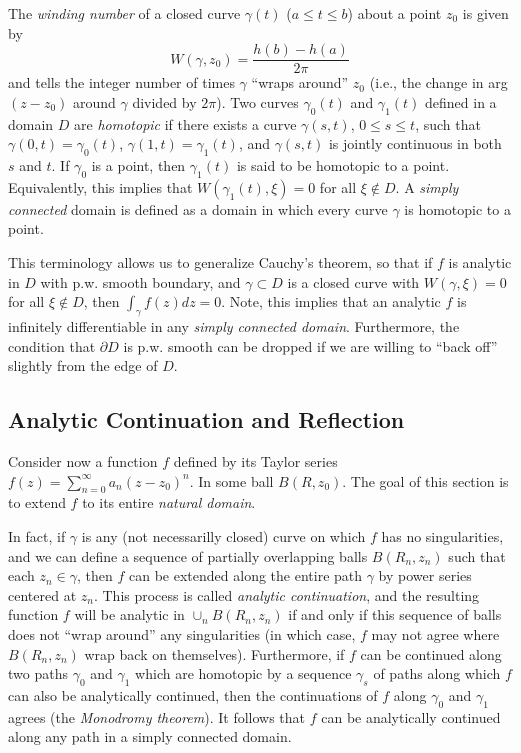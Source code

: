 \documentclass[12pt]{article}
\begin{document}
The {\it winding number} of a closed curve $\gamma(t)$ ($a \leq t \leq b$)
about a point $z_0$ is given by
$$
W(\gamma, z_0) = \frac{h(b) - h(a)}{2\pi}
$$
and tells the integer number of times $\gamma$ ``wraps around'' $z_0$
(i.e., the change in arg$(z-z_0)$ around $\gamma$ divided by $2\pi$).
Two curves $\gamma_0(t)$ and $\gamma_1(t)$ defined in a domain $D$
are {\it homotopic} if there exists a curve $\gamma(s,t)$, $0\leq s\leq t$,
such that $\gamma(0,t)=\gamma_0(t)$, $\gamma(1,t)=\gamma_1(t)$, and
$\gamma(s,t)$ is jointly continuous in both $s$ and $t$. If $\gamma_0$
is a point, then $\gamma_1(t)$ is said to be homotopic to a point.
Equivalently, this implies that $W(\gamma_1(t),\xi)=0$ for all
$\xi\not\in D$. A {\it simply connected} domain is defined as a domain
in which every curve $\gamma$ is homotopic to a point.

This terminology allows us to generalize Cauchy's theorem, so that if $f$
is analytic in $D$ with p.w. smooth boundary, and $\gamma\subset D$ is
a closed curve with $W(\gamma, \xi) = 0$ for all $\xi\not\in D$, then 
$\int_\gamma f(z) dz = 0$. Note, this implies that an analytic $f$ is
infinitely differentiable in any {\it simply connected domain}.
Furthermore, the condition that $\partial D$ is p.w. smooth can be
dropped if we are willing to ``back off'' slightly from the edge of $D$.

\subsection*{Analytic Continuation and Reflection}

Consider now a function $f$ defined by its Taylor series
$f(z) = \sum_{n=0}^\infty a_n (z - z_0)^n$. In some ball $B(R,z_0)$.
The goal of this section is to extend $f$ to its entire {\it natural domain}.

In fact, if $\gamma$ is any (not necessarilly closed) curve on which
$f$ has no singularities, and we can define a sequence of partially
overlapping balls $B(R_n, z_n)$ such that each $z_n\in\gamma$, then
$f$ can be extended along the entire path $\gamma$ by power series centered
at $z_n$. This process is called {\it analytic continuation}, and the
resulting function $f$ will be analytic in $\cup_{n} B(R_n,z_n)$ if and only
if this sequence of balls does not ``wrap around'' any singularities
(in which case, $f$ may not agree where $B(R_n,z_n)$ wrap back on
themselves). Furthermore, if $f$ can be continued along two paths
$\gamma_0$ and $\gamma_1$ which are homotopic by a sequence $\gamma_s$
of paths along which $f$ can also be analytically continued, then
the continuations of $f$ along $\gamma_0$ and $\gamma_1$ agrees
(the {\it Monodromy theorem}).
It follows that $f$ can be analytically continued along any path in a
simply connected domain.
\end{document}

